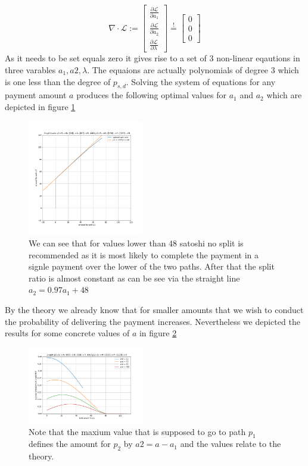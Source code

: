 \documentclass[10pt,twocolumn]{article}
\begin{document}
\[
    \nabla\cdot\mathcal{L} := \begin{bmatrix}
           \frac{\partial\mathcal{L}}{\partial a_1} \\
           \frac{\partial\mathcal{L}}{\partial a_2} \\
           \frac{\partial\mathcal{L}}{\partial \lambda}
    \end{bmatrix}  \stackrel{!}{=}
    \begin{bmatrix}
           0 \\
           0 \\
           0
    \end{bmatrix}
\]
As it needs to be set equals zero it gives rise to a set of $3$ non-linear eqautions in three varables $a_1,a2,\lambda$.
The equaions are actually polynomials of degree $3$ which is one less than the degree of $p_{s,d}$.
Solving the system of equations for any payment amount $a$ produces the following optimal values for $a_1$ and $a_2$ which are depicted in figure \ref{fig:optimal_split_example}
\begin{figure}[htpb]
  \center
  \includegraphics[width=0.45\textwidth]{img/optimal_split_example.png}
  \caption{We can see that for values lower than 48 satoshi no split is recommended as it is most likely to complete the payment in a signle payment over the lower of the two paths. After that the split ratio is almost constant as can be see via the straight line $a_2=0.97a_1 + 48$}
  \label{fig:optimal_split_example}
\end{figure}

By the theory we already know that for smaller amounts that we wish to conduct the probability of delivering the payment increases.
Nevertheless we depicted the results for some concrete values of $a$ in figure \ref{fig:optimal_split_example_amounts}

\begin{figure}[htpb]
  \center
  \includegraphics[width=0.45\textwidth]{img/optimal_split_example_amounts.png}
  \caption{Note that the maxium value that is supposed to go to path $p_1$ defines the amount for $p_2$ by $a2=a-a_1$ and the values relate to the theory.}
  \label{fig:optimal_split_example_amounts}
\end{figure}
\end{document}
